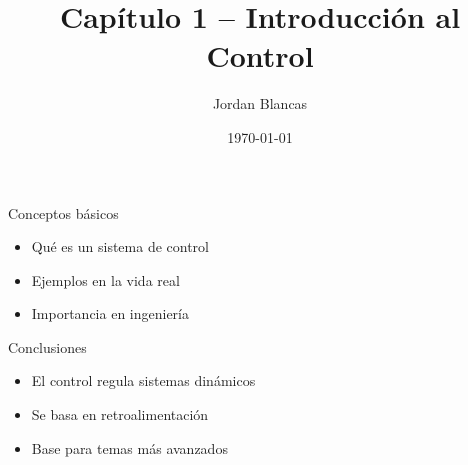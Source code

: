\documentclass{beamer}
\title{Capítulo 1 – Introducción al Control}
\author{Jordan Blancas}
\date{\today}
\begin{document}
\begin{frame}
  \titlepage
\end{frame}

\begin{frame}{Conceptos básicos}
  \begin{itemize}
    \item Qué es un sistema de control
    \item Ejemplos en la vida real
    \item Importancia en ingeniería
  \end{itemize}
\end{frame}


\begin{frame}{Conclusiones}
  \begin{itemize}
    \item El control regula sistemas dinámicos
    \item Se basa en retroalimentación
    \item Base para temas más avanzados
  \end{itemize}
\end{frame}
\end{document}
